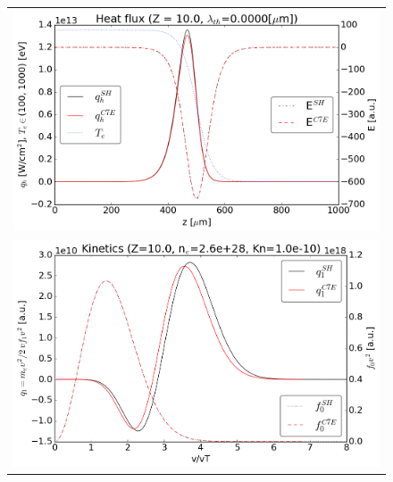 \documentclass[preprint,12pt]{elsarticle}
\begin{document}
\begin{figure}[tbh]
  \begin{center}
    \begin{tabular}{c}
      \includegraphics[width=1.0\textwidth]{../results/fe_analysis/C7E/P5_heatflux_Z10_Kn1e-10.png} \\ 
      \includegraphics[width=1.0\textwidth]{../results/fe_analysis/C7E/P5_kinetics_Z10_Kn1e-10.png}
    \end{tabular}
  \caption{
  }
  \end{center}
  \label{fig:AWBScorrection_f1}
\end{figure}
\end{document}
